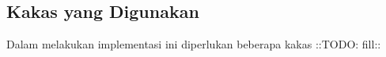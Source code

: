 \subsection{Kakas yang Digunakan}
Dalam melakukan implementasi ini diperlukan beberapa kakas ::TODO: fill::